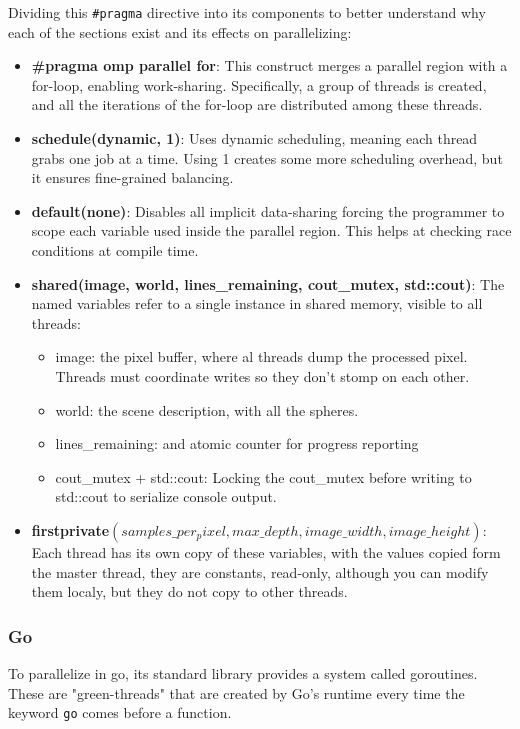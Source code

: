 Dividing this \texttt{\#pragma} directive into its components to better understand why each of the sections exist and its effects on parallelizing:
\begin{itemize}
    \item \textbf{\#pragma omp parallel for}: This construct merges a parallel region with a for-loop, enabling work-sharing. Specifically, a group of threads is created, and all the iterations of the for-loop  are distributed among these threads.
    
    \item \textbf{schedule(dynamic, 1)}: Uses dynamic scheduling, meaning each thread grabs one job at a time. Using 1 creates some more scheduling overhead, but it ensures fine-grained balancing.
    
    \item \textbf{default(none)}: Disables all implicit data-sharing forcing the programmer to scope each variable used inside the parallel region. This helps at checking race conditions at compile time.
    
    \item \textbf{shared(image, world, lines\_remaining, cout\_mutex, std::cout)}: The named variables refer to a single instance in shared memory, visible to all threads:
    \begin{itemize}
        \item image: the pixel buffer, where al threads dump the processed pixel. Threads must coordinate writes so they don't stomp on each other.
        \item world: the scene description, with all the spheres.
        \item lines\_remaining: and atomic counter for progress reporting
        \item cout\_mutex + std::cout: Locking the cout\_mutex before writing to std::cout to serialize console output.
    \end{itemize}
    
    \item \textbf{firstprivate$(
    samples\_ per_pixel,
    max\_ depth,
    image\_ width,
    image\_ height)$}:
    Each thread has its own copy of these variables, with the values copied form the master thread, they are constants, read-only, although you can modify them localy, but they do not copy to other threads.
\end{itemize}

\subsubsection{Go}
To parallelize in go, its standard library provides a system called \glspl{goroutine}. These are "\glspl{green-thread}" that are created by Go's runtime every time the keyword \texttt{go} comes before a function.

